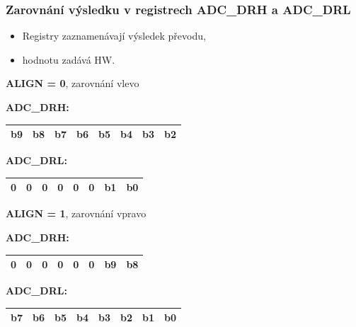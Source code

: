 	\begin{frame}
    \frametitle{Zarovnání výsledku v registrech ADC\_DRH a ADC\_DRL}
		
		\begin{itemize}
			\item Registry zaznamenávají výsledek převodu,
			\item hodnotu zadává HW.
		\end{itemize}
		
		\vspace{3mm}
		\textbf{ALIGN = 0}, zarovnání vlevo
		
		\begin{center}
		\textbf{ADC\_DRH:}
			\begin{tabular}{ | p{5mm} | p{5mm} | p{5mm} | p{5mm} | p{5mm} | p{5mm} | p{5mm} | p{5mm} |}
				\hline
				\hline
				\textbf{b9} & \textbf{b8} & \textbf{b7} & \textbf{b6} & \textbf{b5} & \textbf{b4} & \textbf{b3} & \textbf{b2} \\
				\hline
				\hline
			\end{tabular}
		\end{center}
		
		\begin{center}
		\textbf{ADC\_DRL:}
			\begin{tabular}{ | p{5mm} | p{5mm} | p{5mm} | p{5mm} | p{5mm} | p{5mm} | p{5mm} | p{5mm} |}
				\hline
				\hline
				\textbf{0} & \textbf{0} & \textbf{0} & \textbf{0} & \textbf{0} & \textbf{0} & \textbf{b1} & \textbf{b0} \\
				\hline
				\hline
			\end{tabular}
		\end{center}
		
		\vspace{3mm}
		\textbf{ALIGN = 1}, zarovnání vpravo
		
		\begin{center}
		\textbf{ADC\_DRH:}
			\begin{tabular}{ | p{5mm} | p{5mm} | p{5mm} | p{5mm} | p{5mm} | p{5mm} | p{5mm} | p{5mm} |}
				\hline
				\hline
				\textbf{0} & \textbf{0} & \textbf{0} & \textbf{0} & \textbf{0} & \textbf{0} & \textbf{b9} & \textbf{b8} \\
				\hline
				\hline
			\end{tabular}
		\end{center}
		
		\begin{center}
		\textbf{ADC\_DRL:}
			\begin{tabular}{ | p{5mm} | p{5mm} | p{5mm} | p{5mm} | p{5mm} | p{5mm} | p{5mm} | p{5mm} |}
				\hline
				\hline
				\textbf{b7} & \textbf{b6} & \textbf{b5} & \textbf{b4} & \textbf{b3} & \textbf{b2} & \textbf{b1} & \textbf{b0} \\
				\hline
				\hline
			\end{tabular}
		\end{center}

	\end{frame}
	
